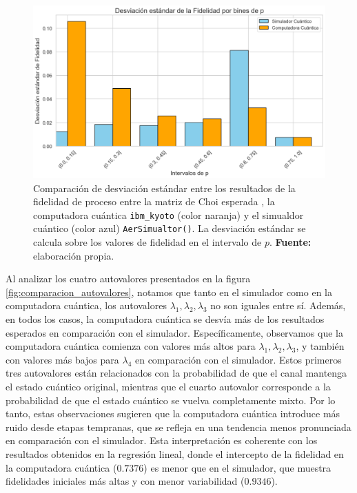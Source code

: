 \documentclass[letterpaper,12pt]{thesisECFM}
\theoremstyle{plain}
\theoremstyle{definition}
\theoremstyle{remark}
\newcommand{\1}{\mathbb{1}}
\begin{document}
\begin{figure}[h!]
    \centering
    \includegraphics[width=0.95\linewidth]{imagenes/Comparacion_desviaciones.png}
    \caption{Comparación de desviación estándar entre los resultados de la fidelidad de proceso entre la matriz de Choi esperada , la computadora cuántica \texttt{ibm\_kyoto} (color naranja) y el simualdor cuántico (color azul) \texttt{AerSimualtor()}. La desviación estándar se calcula sobre los valores de fidelidad en el intervalo de $p$. \textbf{Fuente:} elaboración propia.}
    \label{fig:comparacion_desviaciones}
\end{figure}


Al analizar los cuatro autovalores presentados en la figura
\ref{fig:comparacion_autovalores}, notamos que tanto en el simulador como en la
computadora cuántica, los autovalores $\lambda_1,\lambda_2,\lambda_3$ no son
iguales entre sí. Además, en todos los casos, la computadora cuántica se desvía
más de los resultados esperados en comparación con el simulador.
Específicamente, observamos que la computadora cuántica comienza con valores
más altos para $\lambda_1,\lambda_2,\lambda_3$, y también con valores más bajos
para $\lambda_4$ en comparación con el simulador.  Estos primeros tres
autovalores están relacionados con la probabilidad de que el canal mantenga el
estado cuántico original, mientras que el cuarto autovalor corresponde a la
probabilidad de que el estado cuántico se vuelva completamente mixto. Por lo
tanto, estas observaciones sugieren que la computadora cuántica introduce más
ruido desde etapas tempranas, que se refleja en una tendencia menos pronunciada
en comparación con el simulador. Esta interpretación es coherente con los
resultados obtenidos en la regresión lineal, donde el intercepto de la
fidelidad en la computadora cuántica ($0.7376$) es menor que en el simulador,
que muestra fidelidades iniciales más altas y con menor variabilidad
($0.9346$).
\end{document}
